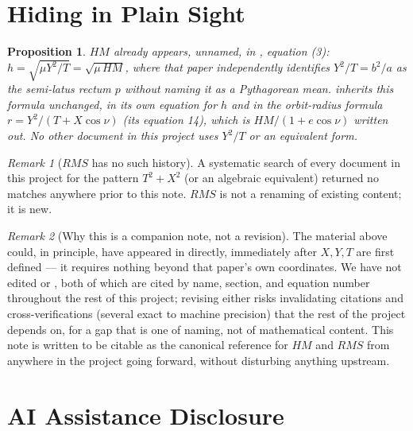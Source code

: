 \documentclass[12pt]{amsart}
\theoremstyle{plain}
\newtheorem{proposition}[theorem]{Proposition}
\theoremstyle{remark}
\newtheorem*{remark}{Remark}
\begin{document}
\section{Hiding in Plain Sight}

\begin{proposition}
$HM$ already appears, unnamed, in \cite{Ebert2026Cone}, equation (3): $h=\sqrt{\mu Y^2/T}=\sqrt{\mu\,HM}$, where that paper independently identifies $Y^2/T=b^2/a$ as the semi-latus rectum $p$ without naming it as a Pythagorean mean. \cite{Ebert2026Clock} inherits this formula unchanged, in its own equation for $h$ and in the orbit-radius formula $r=Y^2/(T+X\cos\nu)$ (its equation 14), which is $HM/(1+e\cos\nu)$ written out. No other document in this project uses $Y^2/T$ or an equivalent form.
\end{proposition}

\begin{remark}[$RMS$ has no such history]
A systematic search of every document in this project for the pattern $T^2+X^2$ (or an algebraic equivalent) returned no matches anywhere prior to this note. $RMS$ is not a renaming of existing content; it is new.
\end{remark}

\begin{remark}[Why this is a companion note, not a revision]
The material above could, in principle, have appeared in \cite{Ebert2026Table} directly, immediately after $X,Y,T$ are first defined --- it requires nothing beyond that paper's own coordinates. We have not edited \cite{Ebert2026Table} or \cite{Ebert2026Cone}, both of which are cited by name, section, and equation number throughout the rest of this project; revising either risks invalidating citations and cross-verifications (several exact to machine precision) that the rest of the project depends on, for a gap that is one of naming, not of mathematical content. This note is written to be citable as the canonical reference for $HM$ and $RMS$ from anywhere in the project going forward, without disturbing anything upstream.
\end{remark}

\section*{AI Assistance Disclosure}
\end{document}
